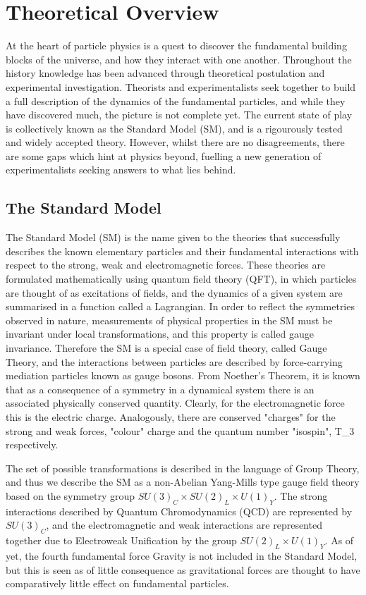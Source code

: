 \chapter{Theoretical Overview}

At the heart of particle physics is a quest to discover the fundamental building blocks of the universe, and how they interact with one another. Throughout the history knowledge has been advanced through theoretical postulation and experimental investigation. Theorists and experimentalists seek together to build a full description of the dynamics of the fundamental particles, and while they have discovered much, the picture is not complete yet. The current state of play is collectively known as the Standard Model (SM), and is a rigourously tested and widely accepted theory. However, whilst there are no disagreements, there are some gaps which hint at physics beyond, fuelling a new generation of experimentalists seeking answers to what lies behind. 

\section{The Standard Model}

The Standard Model (SM) is the name given to the theories that successfully describes the known elementary particles and their fundamental interactions with respect to the strong, weak and electromagnetic forces.  These theories are formulated mathematically using quantum field theory (QFT), in which particles are thought of as excitations of fields, and the dynamics of a given system are summarised in a function called a Lagrangian. In order to reflect the symmetries observed in nature, measurements of physical properties in the SM must be invariant under local transformations, and this property is called gauge invariance. Therefore the SM is a special case of field theory, called Gauge Theory, and the interactions between particles are described by force-carrying mediation particles known as gauge bosons. From Noether's Theorem, it is known that as a consequence of a symmetry in a dynamical system there is an associated physically conserved quantity. Clearly, for the electromagnetic force this is the electric charge. Analogously, there are conserved "charges" for the strong and weak forces, "colour" charge and the quantum number "isospin", T_{3} respectively. 
 
The set of possible transformations is described in the language of Group Theory, and thus we describe the SM as a non-Abelian Yang-Mills type gauge field theory based on the symmetry group $SU(3)_{C} \times SU(2)_{L} \times U(1)_{Y}$. The strong interactions described by Quantum Chromodynamics (QCD) are represented by $SU(3)_{C}$, and the electromagnetic and weak interactions are represented together due to Electroweak Unification by the group $SU(2)_L \times U(1)_{Y}$. As of yet, the fourth fundamental force Gravity is not included in the Standard Model, but this is seen as of little consequence as gravitational forces are thought to have comparatively little effect on fundamental particles. 




